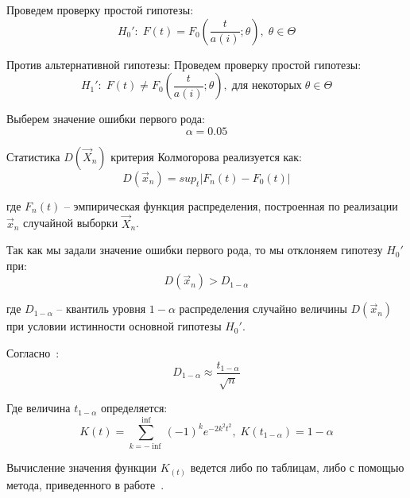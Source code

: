 Проведем проверку простой гипотезы:
\begin{equation}
\label{equation:distrHyp0Simple}
H_0': \; F(t) = F_0(\frac{t}{a(i)};\theta), \; \theta \in \Theta
\end{equation}

Против альтернативной гипотезы:
Проведем проверку простой гипотезы:
\begin{equation}
\label{equation:distrHyp1Simple}
H_1': \; F(t) \neq F_0(\frac{t}{a(i)};\theta), \; \text{для некоторых} \; \theta \in \Theta
\end{equation}

Выберем значение ошибки первого рода:
\begin{equation}
\alpha = 0.05
\end{equation}

Статистика $D(\vec{X}_n)$ критерия Колмогорова реализуется как:
\begin{equation}
D(\vec{x}_n) = sup_t | F_n(t) - F_0(t) |
\end{equation}
\begin{ESKDExplanation}
\item[где ] $F_n(t)$ -- эмпирическая функция распределения, построенная по реализации $\vec{x}_n$ случайной выборки $\vec{X}_n$.
\end{ESKDExplanation}

Так как мы задали значение ошибки первого рода, то мы отклоняем гипотезу $H_0'$ при:
\begin{equation}
D(\vec{x}_n) > D_{1 - \alpha}
\end{equation}
\begin{ESKDExplanation}
\item[где ] $D_{1 - \alpha}$ -- квантиль уровня $1 - \alpha$ распределения случайно величины $D(\vec{x}_n)$ при условии истинности основной гипотезы $H_0'$.
\end{ESKDExplanation}

Согласно~\cite{BlueStatistics}:
\begin{equation}
D_{1 - \alpha} \approx \frac{t_{1 - \alpha}}{\sqrt{n}}
\end{equation}

Где величина $t_{1 - \alpha}$ определяется:
\begin{equation}
K(t) = \sum_{k = - \inf}^{\inf} (-1)^k e^{-2 k^2 t^2}, \; K(t_{1-\alpha}) =  1 - \alpha
\end{equation}

Вычисление значения функции $K_(t)$ ведется либо по таблицам, либо с помощью метода, приведенного в работе~\cite{KolmogorovSmirnov}.

